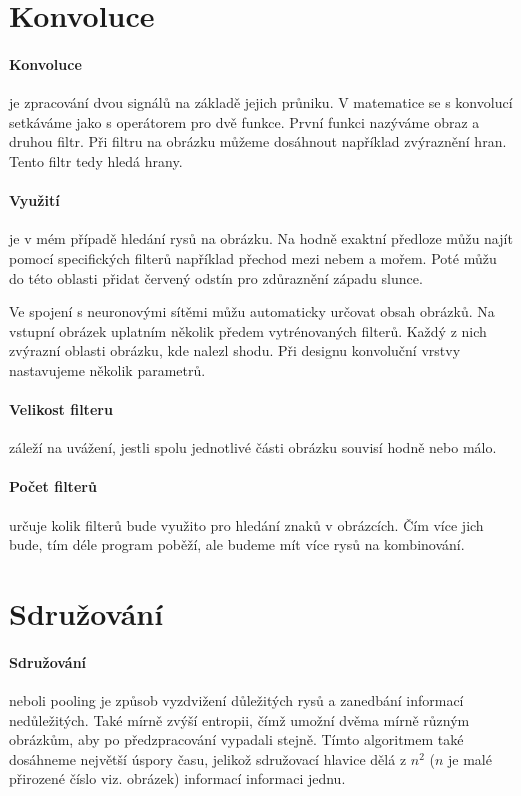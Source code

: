 \documentclass[12pt,a4paper]{report}
\begin{document}
\section{Konvoluce}
\paragraph{Konvoluce}
je zpracování dvou signálů na základě jejich průniku. V matematice se s konvolucí setkáváme jako s operátorem pro dvě funkce. První funkci nazýváme obraz a druhou filtr. Při filtru na obrázku můžeme dosáhnout například zvýraznění hran. Tento filtr tedy hledá hrany.
\paragraph{Využití}
je v mém případě hledání rysů na obrázku. Na hodně exaktní předloze můžu najít pomocí specifických filterů například přechod mezi nebem a mořem. Poté můžu do této oblasti přidat červený odstín pro zdůraznění západu slunce.

Ve spojení s neuronovými sítěmi můžu automaticky určovat obsah obrázků. Na vstupní obrázek uplatním několik předem vytrénovaných filterů. Každý z nich zvýrazní oblasti obrázku, kde nalezl shodu. Při designu konvoluční vrstvy nastavujeme několik parametrů.

\paragraph{Velikost filteru}
záleží na uvážení, jestli spolu jednotlivé části obrázku souvisí hodně nebo málo.
\paragraph{Počet filterů}
určuje kolik filterů bude využito pro hledání znaků v obrázcích. Čím více jich bude, tím déle program poběží, ale budeme mít více rysů na kombinování.
\section{Sdružování}
\paragraph{Sdružování}
neboli pooling je způsob vyzdvižení důležitých rysů a zanedbání informací nedůležitých. Také mírně zvýší entropii, čímž umožní dvěma mírně různým obrázkům, aby po předzpracování vypadali stejně. Tímto algoritmem také dosáhneme největší úspory času, jelikož sdružovací hlavice dělá z $n^2$ ($n$ je malé přirozené číslo viz. obrázek) informací informaci jednu.
\end{document}
